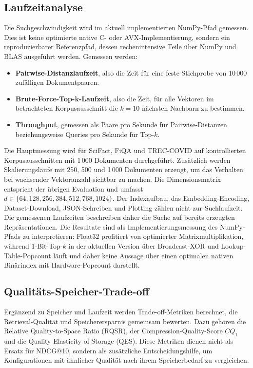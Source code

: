 \subsection{Laufzeitanalyse}
%
Die Suchgeschwindigkeit wird im aktuell implementierten NumPy-Pfad gemessen.
Dies ist keine optimierte native C- oder AVX-Implementierung, sondern ein reproduzierbarer Referenzpfad, dessen rechenintensive Teile über NumPy und BLAS ausgeführt werden.
Gemessen werden:
\begin{itemize}
  \item \textbf{Pairwise-Distanzlaufzeit}, also die Zeit für eine feste Stichprobe von 10\,000 zufälligen Dokumentpaaren.
  \item \textbf{Brute-Force-Top-$\boldsymbol{k}$-Laufzeit}, also die Zeit, für alle Vektoren im betrachteten Korpusausschnitt die $k = 10$ nächsten Nachbarn zu bestimmen.
  \item \textbf{Throughput}, gemessen als Paare pro Sekunde für Pairwise-Distanzen beziehungsweise Queries pro Sekunde für Top-$k$.
\end{itemize}
%
Die Hauptmessung wird für SciFact, FiQA und TREC-COVID auf kontrollierten Korpusausschnitten mit 1\,000 Dokumenten durchgeführt.
Zusätzlich werden Skalierungsläufe mit 250, 500 und 1\,000 Dokumenten erzeugt, um das Verhalten bei wachsender Vektoranzahl sichtbar zu machen.
Die Dimensionsmatrix entspricht der übrigen Evaluation und umfasst $d \in \{64, 128, 256, 384, 512, 768, 1024\}$.
%
Der Indexaufbau, das Embedding-Encoding, Dataset-Download, JSON-Schreiben und Plotting zählen nicht zur Suchlaufzeit.
Die gemessenen Laufzeiten beschreiben daher die Suche auf bereits erzeugten Repräsentationen.
Die Resultate sind als Implementierungsmessung des NumPy-Pfads zu interpretieren: Float32 profitiert von optimierter Matrixmultiplikation, während 1-Bit-Top-$k$ in der aktuellen Version über Broadcast-XOR und Lookup-Table-Popcount läuft und daher keine Aussage über einen optimalen nativen Binärindex mit Hardware-Popcount darstellt.
%
\subsection{Qualitäts-Speicher-Trade-off}
%
Ergänzend zu Speicher und Laufzeit werden Trade-off-Metriken berechnet, die Retrieval-Qualität und Speicherersparnis gemeinsam bewerten.
Dazu gehören die Relative Quality-to-Space Ratio (RQSR), der Compression-Quality-Score $CQ_1$ und die Quality Elasticity of Storage (QES).
Diese Metriken dienen nicht als Ersatz für NDCG@10, sondern als zusätzliche Entscheidungshilfe, um Konfigurationen mit ähnlicher Qualität nach ihrem Speicherbedarf zu vergleichen.
%
